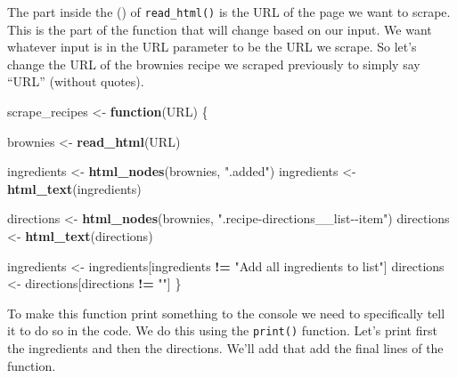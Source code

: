 \documentclass[
  12pt,
]{book}
\newenvironment{Shaded}{\begin{snugshade}}{\end{snugshade}}
\newcommand{\ControlFlowTok}[1]{\textcolor[rgb]{0.27,0.27,0.27}{\textbf{#1}}}
\newcommand{\KeywordTok}[1]{\textcolor[rgb]{0.27,0.27,0.27}{\textbf{#1}}}
\newcommand{\NormalTok}[1]{#1}
\newcommand{\OperatorTok}[1]{\textcolor[rgb]{0.43,0.43,0.43}{\textbf{#1}}}
\newcommand{\StringTok}[1]{\textcolor[rgb]{0.5,0.5,0.5}{#1}}
\begin{document}
The part inside the () of \texttt{read\_html()} is the URL of the page we want to scrape. This is the part of the function that will change based on our input. We want whatever input is in the URL parameter to be the URL we scrape. So let's change the URL of the brownies recipe we scraped previously to simply say ``URL'' (without quotes).

\begin{Shaded}
\begin{Highlighting}[]
\NormalTok{scrape\_recipes \textless{}{-}}\StringTok{ }\ControlFlowTok{function}\NormalTok{(URL) \{}
  
\NormalTok{  brownies \textless{}{-}}\StringTok{ }\KeywordTok{read\_html}\NormalTok{(URL)}
  
\NormalTok{  ingredients \textless{}{-}}\StringTok{ }\KeywordTok{html\_nodes}\NormalTok{(brownies, }\StringTok{".added"}\NormalTok{)}
\NormalTok{  ingredients \textless{}{-}}\StringTok{ }\KeywordTok{html\_text}\NormalTok{(ingredients)}
  
\NormalTok{  directions \textless{}{-}}\StringTok{ }\KeywordTok{html\_nodes}\NormalTok{(brownies, }\StringTok{".recipe{-}directions\_\_list{-}{-}item"}\NormalTok{)}
\NormalTok{  directions \textless{}{-}}\StringTok{ }\KeywordTok{html\_text}\NormalTok{(directions)}
  
\NormalTok{  ingredients \textless{}{-}}\StringTok{ }\NormalTok{ingredients[ingredients }\OperatorTok{!=}\StringTok{ "Add all ingredients to list"}\NormalTok{]}
\NormalTok{  directions \textless{}{-}}\StringTok{ }\NormalTok{directions[directions }\OperatorTok{!=}\StringTok{ ""}\NormalTok{]}
\NormalTok{\}}
\end{Highlighting}
\end{Shaded}

To make this function print something to the console we need to specifically tell it to do so in the code. We do this using the \texttt{print()} function. Let's print first the ingredients and then the directions. We'll add that add the final lines of the function.
\end{document}
